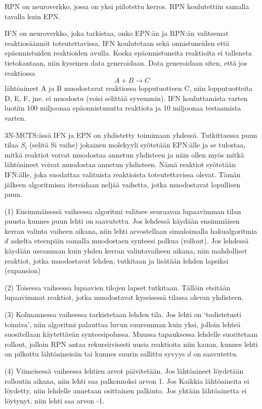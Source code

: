 \documentclass[finnish,twoside,censored,subject,sw-line]{HYthesisML}
\begin{document}
RPN on neuroverkko, jossa on yksi piilotettu kerros. RPN koulutettiin samalla tavalla kuin EPN.

IFN on neuroverkko, joka tarkistaa, onko EPN:än ja RPN:än valitsemat reaktiosäännöt toteutettavissa.
IFN koulutetaan sekä onnistuneiden että epäonnistuiden reaktioiden avulla. Koska epäonnistuneita
reaktioita ei talleneta tietokantaan, niin kyseinen data generoidaan. Data generoidaan siten, että jos reaktiossa
\[A + B \rightarrow C\] lähtöaineet A ja B muodostavat reaktiossa lopputuotteen C, niin lopputuotteita
D, E, F, jne. ei muodostu (voisi selittää syvemmin). IFN kouluttamista varten luotiin 100 miljoonaa
epäonnistunutta reaktiota ja 10 miljoonaa testaamista varten.

3N-MCTS:ässä IFN ja EPN on yhdistetty toimimaan yhdessä. Tutkittaessa puun tilaa $S_i$ (selitä Si vaihe) jokainen
molekyyli syötetään EPN:älle ja se tulostaa, mitkä reaktiot voivat muodostaa annetun yhdisteen ja näin ollen
myös mitkä lähtöaineet voivat muodostaa annetun yhdisteen. Nämä reaktiot syötetään IFN:älle, joka suodattaa
valituista reaktioista toteutettavissa olevat. Tämän jälkeen algoritmissa iteroidaan neljää vaihetta, jotka
muodostavat lopullisen puun.

(1) Ensimmäisessä vaiheessa algoritmi valitsee seuraavan lupaavimman tilan puusta kunnes puun lehti on saavutettu.
Jos lehdessä käydään ensimmäisen kerran valinta vaiheen aikana, niin lehti arvostellaan simuloimalla hakualgoritmia
$d$ askelta eteenpäin samalla muodostaen synteesi polkua (rollout). Jos lehdessä käydään useamman kuin yhden
kerran valintavaiheen aikana, niin mahdolliset reaktiot, jotka muodostavat lehden, tutkitaan ja lisätään lehden
lapsiksi (expansion)

(2) Toisessa vaiheessa lupaavien tilojen lapset tutkitaan. Tällöin etsitään lupaavimmat reaktiot, jotka muodostavat
kyseisessä tilassa olevan yhdisteen.

(3) Kolmannessa vaiheessa tarkistetaan lehden tila. Jos lehti on `todistetusti toimiva', niin algoritmi palauttaa
luvun suuremman kuin yksi, jolloin lehteä suositellaan käytettävän synteesipolussa. Muussa tapauksessa lehdelle
suoritetaan rollout, jolloin RPN antaa rekursiivisesti uusia reaktioita niin kauan, kunnes lehti on pilkottu
lähtöaineisiin tai kunnes suurin sallittu syvyys $d$ on saavutettu.

(4) Viimeisessä vaiheessa lehtien arvot päivitetään. Jos lähtöaineet löydetään rolloutin aikana, niin lehti saa
palkonnoksi arvon 1. Jos Kaikkia lähtöaineita ei löydetty, niin lehdelle annetaan osittainen palkinto. Jos yhtään
lähtöainetta ei löytynyt, niin lehti saa arvon -1.
\end{document}
